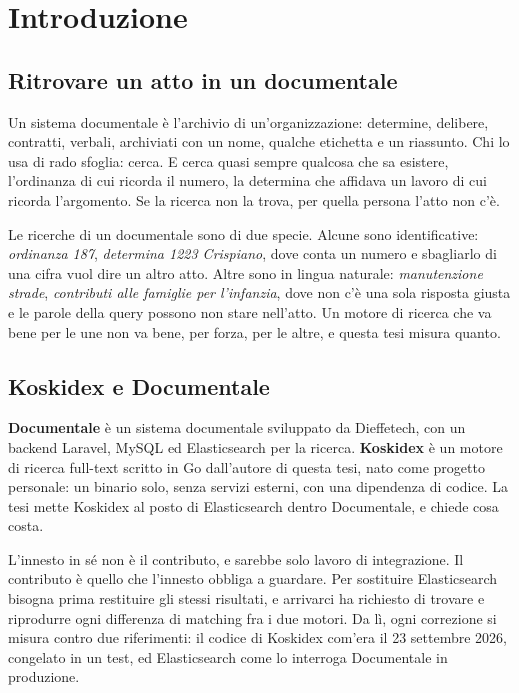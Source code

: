 \chapter{Introduzione}\label{chapter:introduzione}

\section{Ritrovare un atto in un documentale}\label{sec:ritrovare}

Un sistema documentale è l'archivio di un'organizzazione: determine, delibere,
contratti, verbali, archiviati con un nome, qualche etichetta e un riassunto. Chi
lo usa di rado sfoglia: cerca. E cerca quasi sempre qualcosa che sa esistere,
l'ordinanza di cui ricorda il numero, la determina che affidava un lavoro di cui
ricorda l'argomento. Se la ricerca non la trova, per quella persona l'atto non
c'è.

Le ricerche di un documentale sono di due specie. Alcune sono identificative:
\emph{ordinanza 187}, \emph{determina 1223 Crispiano}, dove conta un numero e
sbagliarlo di una cifra vuol dire un altro atto. Altre sono in lingua naturale:
\emph{manutenzione strade}, \emph{contributi alle famiglie per l'infanzia}, dove
non c'è una sola risposta giusta e le parole della query possono non stare
nell'atto. Un motore di ricerca che va bene per le une non va bene, per forza,
per le altre, e questa tesi misura quanto.

\section{Koskidex e Documentale}\label{sec:due-sistemi}

\textbf{Documentale} è un sistema documentale sviluppato da Dieffetech, con un
backend Laravel, MySQL ed Elasticsearch per la ricerca. \textbf{Koskidex} è un
motore di ricerca full-text scritto in Go dall'autore di questa tesi, nato come
progetto personale: un binario solo, senza servizi esterni, con una dipendenza
di codice. La tesi mette Koskidex al posto di
Elasticsearch dentro Documentale, e chiede cosa costa.

L'innesto in sé non è il contributo, e sarebbe solo lavoro di integrazione. Il
contributo è quello che l'innesto obbliga a guardare. Per sostituire
Elasticsearch bisogna prima restituire gli stessi risultati, e arrivarci ha
richiesto di trovare e riprodurre ogni differenza di matching fra i due motori.
Da lì, ogni correzione si misura contro due riferimenti: il codice di Koskidex
com'era il 23 settembre 2026, congelato in un test, ed Elasticsearch come lo
interroga Documentale in produzione.

